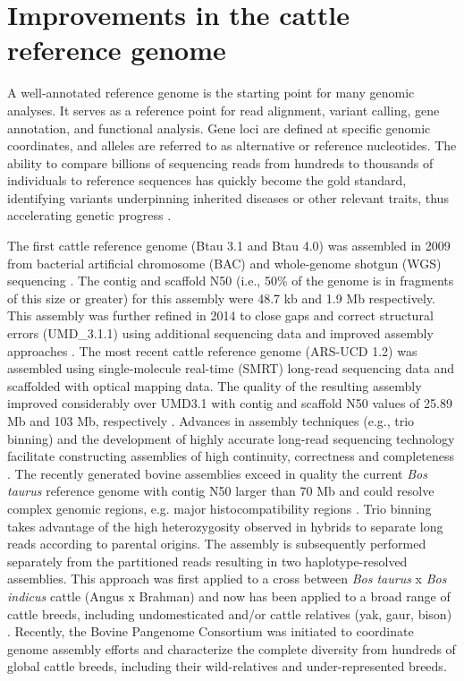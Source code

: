 \documentclass[../main.tex]{subfiles}
\begin{document}
\section{Improvements in the cattle reference genome} 

A well-annotated reference genome is the starting point for many genomic analyses. It serves as a reference point for read alignment, variant calling, gene annotation, and functional analysis. Gene loci are defined at specific genomic coordinates, and alleles are referred to as alternative or reference  nucleotides. The ability to compare billions of sequencing reads from hundreds to thousands of individuals to reference sequences has quickly become the gold standard, identifying variants underpinning  inherited diseases or other relevant traits, thus accelerating genetic progress \citep{bickhart2020symposium}.

The first cattle reference genome (Btau 3.1 and Btau 4.0) was assembled in 2009 from bacterial artificial chromosome (BAC) and whole-genome shotgun (WGS) sequencing \citep{elsik2009genome}. The contig and scaffold N50 (i.e., 50\% of the genome is in fragments of this size or greater) for this assembly were 48.7 kb and 1.9 Mb respectively. This assembly was further refined in 2014 to close gaps and correct structural errors (UMD\_3.1.1) using additional sequencing data and improved assembly approaches \citep{zimin2009whole}. The most recent cattle reference genome (ARS-UCD 1.2) was assembled using single-molecule real-time (SMRT) long-read sequencing data and scaffolded with optical mapping data. The quality of the resulting assembly improved considerably over UMD3.1 with contig and scaffold N50 values of 25.89 Mb and 103 Mb, respectively \citep{rosen2020novo}. Advances in assembly techniques (e.g., trio binning) and the development of highly accurate long-read sequencing technology facilitate constructing assemblies of high continuity, correctness and completeness \citep{bickhart2020symposium}. The recently generated bovine assemblies exceed in quality the current \emph{Bos taurus} reference genome with contig N50 larger than 70 Mb and could resolve complex genomic regions, e.g. major histocompatibility regions \citep{rice2020continuous}. Trio binning takes advantage of the high heterozygosity observed in hybrids to separate long reads according to parental origins. The assembly is subsequently performed separately from the partitioned reads resulting in two haplotype-resolved assemblies. This approach  was first applied  to a cross between \emph{Bos taurus} x \emph{Bos indicus} cattle (Angus x Brahman) \citep{koren2018novo} and now has been applied to a broad range of cattle breeds, including  undomesticated and/or cattle relatives (yak, gaur, bison) \citep{oppenheimer2021reference}. Recently, the Bovine Pangenome Consortium \citep{heaton2021reference} was initiated to coordinate genome assembly efforts and characterize the complete diversity from hundreds of global cattle breeds, including their wild-relatives and under-represented breeds. 
\end{document}
